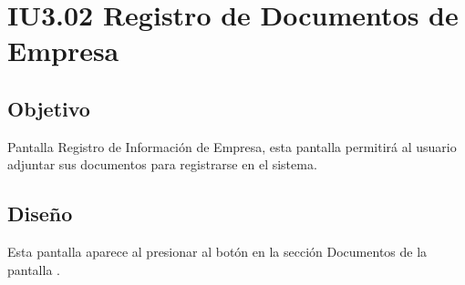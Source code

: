 \newpage
\section{IU3.02 Registro de Documentos de Empresa}

\subsection{Objetivo}
	Pantalla Registro de Información de Empresa, esta pantalla permitirá al usuario adjuntar sus documentos para registrarse en el sistema.
	


\subsection{Diseño}
	Esta pantalla aparece al presionar al botón %
	 en la sección Documentos de la pantalla .


